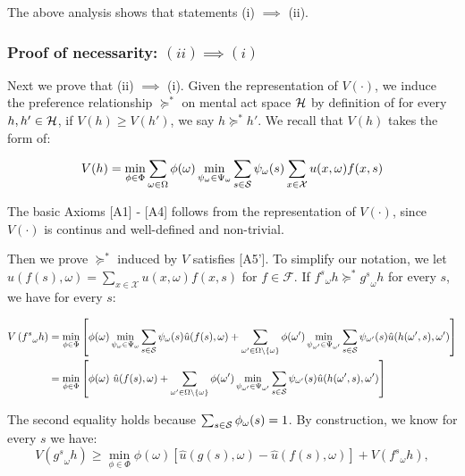 \documentclass[11pt,oneside]{article}
\theoremstyle{plain}
\theoremstyle{plain}
\theoremstyle{plain}
\theoremstyle{plain}
\theoremstyle{plain}
\theoremstyle{definition}
\theoremstyle{definition}
\theoremstyle{remark}
\theoremstyle{plain}
\newcommand{\mcs}{{\cal S}}
\newcommand{\pfs}{\succeq^*}
\begin{document}
The above analysis shows that statements (i) $\implies$ (ii). 

\subsubsection{Proof of necessarity: $(ii) \implies (i)$}

Next we prove that (ii) $\implies$ (i). Given the representation of $V(\cdot)$, we induce the preference relationship $\pfs$ on mental act space ${\cal H}$ by definition of for every $h,h' \in {\cal H}$, if $V(h) \geq V(h')$, we say $h \pfs h'$. We recall that $V(h)$ takes the form of:

\[
V(h) = \min_{\phi \in \Phi} \sum_{\omega \in \Omega}\phi(\omega) \min_{\psi_\omega \in \Psi_\omega} \sum_{s\in \mcs} \psi_\omega(s)\sum_{x\in \mathcal{X}}u(x,\omega)f(x,s)
\]

The basic Axioms [A1] - [A4] follows from the representation of $V(\cdot)$, since $V(\cdot)$ is continus and well-defined and non-trivial. 

Then we prove $\pfs$ induced by $V$ satisfies [A5']. To simplify our notation, we let $\hat{u}(f(s),\omega) = \sum_{x\in \mathcal{X}} u(x,\omega) f(x,s)$ for $f \in \mathcal{F}$.
If ${f^s}_\omega h \pfs {g^s}_\omega h $ for every $s$, we have for every $s$:

\begin{align*}
V\left({f^s}_\omega h\right) &= \min_{\phi \in \Phi}  \left[ \phi(\omega) \min_{\psi_\omega \in \Psi_\omega} \sum_{s\in \mcs} \psi_\omega(s)  \hat{u}(f(s),\omega) + \sum_{\omega' \in \Omega\setminus\{\omega\}} \phi(\omega') \min_{\psi_{\omega'} \in \Psi_{\omega'}}  \sum_{s\in \mcs}\psi_{\omega'}(s) \hat{u}(h(\omega',s),\omega') \right] \\
& = \min_{\phi \in \Phi} \left[ \phi(\omega) \ \hat{u}(f(s),\omega) + \sum_{\omega' \in \Omega\setminus\{\omega\}} \phi(\omega') \min_{\psi_{\omega'} \in \Psi_{\omega'}}  \sum_{s\in \mcs} \psi_{\omega'}(s) \hat{u}(h(\omega',s),\omega') \right] 
\end{align*}

The second equality holds because $\sum_{s\in \mcs} \phi_\omega (s) = 1$. By construction, we know for every $s$ we have:
\[
V({g^s}_\omega h) \geq \min_{\phi \in \Phi} \phi(\omega) \left[ \hat{u}(g(s),\omega) -   \hat{u}(f(s),\omega) \right] + V({f^s}_\omega h),
\]
\end{document}
